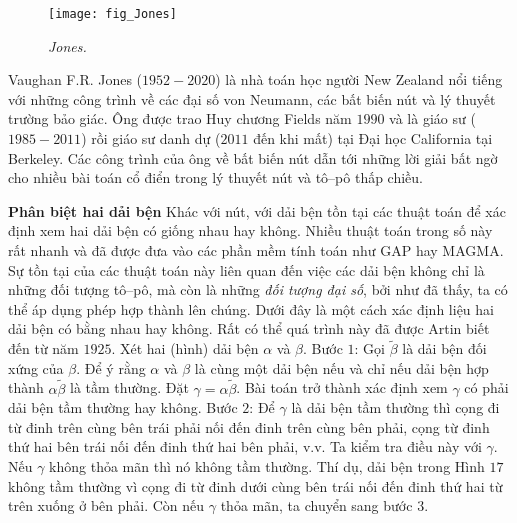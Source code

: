 \begin{multicols}{2}
	\vspace*{-8pt}
	\begin{tBox}
		\begin{figure}
			\vspace*{-15pt}
			\centering
			\captionsetup{labelformat= empty, justification=centering}
			\hspace*{-10pt}\texttt{[image: fig\_Jones]}
			\caption{\small\textit{\color{duongvaotoanhoc}Jones.}}
			\vspace*{-15pt}
		\end{figure}
		Vaughan F.R. Jones ($1952-2020$) là nhà toán học người New Zealand nổi tiếng với những công trình về các đại số von Neumann, các bất biến nút và lý thuyết trường bảo giác. Ông được trao Huy chương Fields năm $1990$ và là giáo sư ($1985-2011$) rồi giáo sư danh dự ($2011$ đến khi mất) tại Đại học California tại Berkeley. Các công trình của ông về bất biến nút dẫn tới những lời giải bất ngờ cho nhiều bài toán cổ điển trong lý thuyết nút và tô--pô thấp chiều.
	\end{tBox}
	\vskip 0.05cm
	\textbf{\color{duongvaotoanhoc}Phân biệt hai dải bện}
	\vskip 0.1cm
	Khác với nút, với dải bện tồn tại các thuật toán để xác định xem hai dải bện có giống nhau hay không. Nhiều thuật toán trong số này rất nhanh và đã được đưa vào các phần mềm tính toán như GAP hay MAGMA. Sự tồn tại của các thuật toán này liên quan đến việc các dải bện không chỉ là những đối tượng tô--pô, mà còn là những \textit{đối tượng đại số}, bởi như đã thấy, ta có thể áp dụng phép hợp thành lên chúng. Dưới đây là một cách xác định liệu hai dải bện có bằng nhau hay không. Rất có thể quá trình này đã được Artin biết đến từ năm $1925$.
	\vskip 0.1cm
	Xét hai (hình) dải bện $\alpha$ và $\beta$.
	\vskip 0.1cm
	Bước $1$: Gọi $\tilde \beta$ là dải bện đối xứng của $\beta$. Để ý rằng $\alpha$ và $\beta$ là cùng một dải bện nếu và chỉ nếu dải bện hợp thành $\alpha \tilde \beta$ là tầm thường. Đặt $\gamma = \alpha \tilde \beta$. Bài toán trở thành xác định xem $\gamma$ có phải dải bện tầm thường hay không.
	\vskip 0.1cm
	Bước $2$: Để $\gamma$ là dải bện tầm thường thì cọng đi từ đinh trên cùng bên trái phải nối đến đinh trên cùng bên phải, cọng từ đinh thứ hai bên trái nối đến đinh thứ hai bên phải, v.v. Ta kiểm tra điều này với $\gamma$. Nếu $\gamma$ không thỏa mãn thì nó không tầm thường. Thí dụ, dải bện trong Hình $17$ không tầm thường vì cọng đi từ đinh dưới cùng bên trái nối đến đinh thứ hai từ trên xuống ở bên phải. Còn nếu $\gamma$ thỏa mãn, ta chuyển sang bước $3$.
	\begin{figure}[H]

\end{figure}
\end{multicols}
